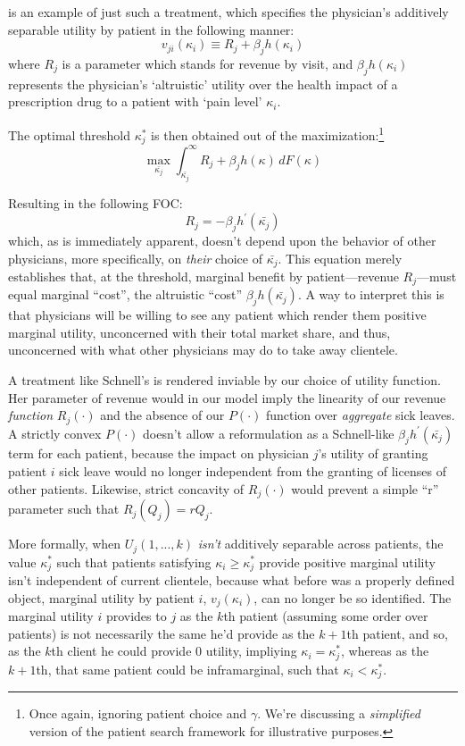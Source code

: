 \documentclass[../main.tex]{subfiles}
\begin{document}
\cite{schnell2017physician} is an example of just such a treatment, which specifies the physician's additively separable utility by patient in the following manner:
\[
v_{ji}(\kappa_i) \equiv R_j + \beta_j h(\kappa_i)
\]
where $R_j$ is a parameter which stands for revenue by visit, and $\beta_j h(\kappa_i)$ represents the physician's `altruistic' utility over the health impact of a prescription drug to a patient with `pain level' $\kappa_i$.

The optimal threshold $\kappa_j^*$ is then obtained out of the maximization:\footnote{Once again, ignoring patient choice and $\gamma$. We're discussing a \textit{simplified} version of the patient search framework for illustrative purposes.}
\[
\max_{\bar{\kappa_j}}\int_{\bar{\kappa_j}}^{\infty}  R_j + \beta_j h(\kappa) \, dF(\kappa)
\]

Resulting in the following FOC:
\[
R_j = - \beta_j h^{\prime}(\bar{\kappa_j})
\]
which, as is immediately apparent, doesn't depend upon the behavior of other physicians, more specifically, on \textit{their} choice of $\bar{\kappa_j}$. This equation merely establishes that, at the threshold, marginal benefit by patient—revenue $R_j$—must equal marginal ``cost'', the altruistic ``cost'' $\beta_j h(\bar{\kappa_j})$. A way to interpret this is that physicians will be willing to see any patient which render them positive marginal utility, unconcerned with their total market share, and thus, unconcerned with what other physicians may do to take away clientele.

A treatment like Schnell's is rendered inviable by our choice of utility function. Her parameter of revenue would in our model imply the linearity of our revenue \textit{function} $R_j(\cdot)$ and the absence of our $P(\cdot)$ function over \textit{aggregate} sick leaves. A strictly convex $P(\cdot)$ doesn't allow a reformulation as a Schnell-like $\beta_j h^{\prime}(\bar{\kappa_j})$ term for each patient, because the impact on physician $j$'s utility of granting patient $i$ sick leave would no longer independent from the granting of licenses of other patients. Likewise, strict concavity of $R_j(\cdot)$ would prevent a simple ``r'' parameter such that $R_j(Q_j) = r Q_j$.

More formally, when $U_j(1,...,k)$ \textit{isn't} additively separable across patients, the value $\kappa_j^*$ such that patients satisfying $\kappa_i \geq \kappa_j^*$ provide positive marginal utility isn't independent of current clientele, because what before was a properly defined object, marginal utility by patient $i$, $v_j(\kappa_i)$, can no longer be so identified. The marginal utility $i$ provides to $j$ as the $k$th patient (assuming some order over patients) is not necessarily the same he'd provide as the $k+1$th patient, and so, as the $k$th client he could provide $0$ utility, impliying $\kappa_i = \kappa_j^*$, whereas as the $k + 1$th, that same patient could be inframarginal, such that $\kappa_i < \kappa_j^*$.
\end{document}
